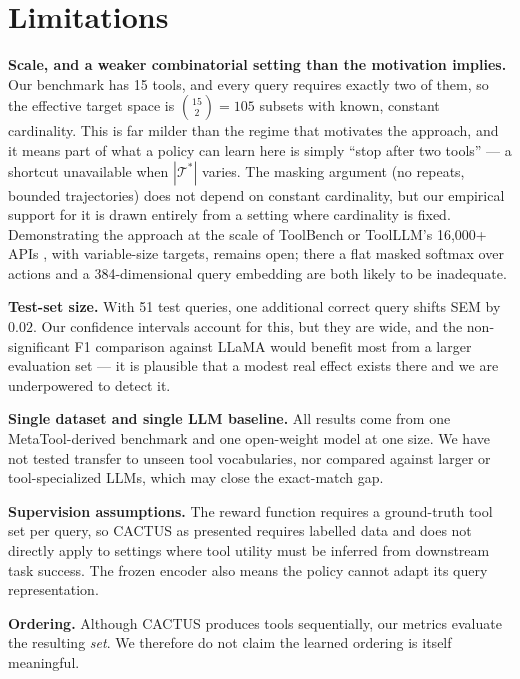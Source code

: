 \documentclass[11pt]{article}
\begin{document}
\section{Limitations}
\textbf{Scale, and a weaker combinatorial setting than the motivation implies.} Our benchmark has 15 tools, and every query requires exactly two of them, so the effective target space is $\binom{15}{2} = 105$ subsets with known, constant cardinality. This is far milder than the regime that motivates the approach, and it means part of what a policy can learn here is simply ``stop after two tools'' --- a shortcut unavailable when $|\mathcal{T}^*|$ varies. The masking argument (no repeats, bounded trajectories) does not depend on constant cardinality, but our empirical support for it is drawn entirely from a setting where cardinality is fixed. Demonstrating the approach at the scale of ToolBench or ToolLLM's 16{,}000+ APIs \cite{qin2023toolllm}, with variable-size targets, remains open; there a flat masked softmax over actions and a 384-dimensional query embedding are both likely to be inadequate.

\textbf{Test-set size.} With 51 test queries, one additional correct query shifts SEM by $0.02$. Our confidence intervals account for this, but they are wide, and the non-significant F1 comparison against LLaMA would benefit most from a larger evaluation set --- it is plausible that a modest real effect exists there and we are underpowered to detect it.

\textbf{Single dataset and single LLM baseline.} All results come from one MetaTool-derived benchmark and one open-weight model at one size. We have not tested transfer to unseen tool vocabularies, nor compared against larger or tool-specialized LLMs, which may close the exact-match gap.

\textbf{Supervision assumptions.} The reward function requires a ground-truth tool set per query, so CACTUS as presented requires labelled data and does not directly apply to settings where tool utility must be inferred from downstream task success. The frozen encoder also means the policy cannot adapt its query representation.

\textbf{Ordering.} Although CACTUS produces tools sequentially, our metrics evaluate the resulting \emph{set}. We therefore do not claim the learned ordering is itself meaningful.
\end{document}

